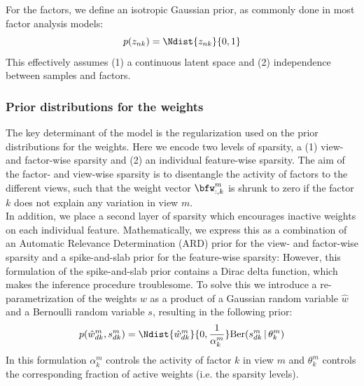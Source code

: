 For the factors, we define an isotropic Gaussian prior, as commonly done in most factor analysis models:
\begin{equation}
	p(z_{nk}) = \Ndist{z_{nk}}{0,1}
\end{equation}
This effectively  assumes (1) a continuous latent space and (2) independence between samples and factors. 

\subsubsection{Prior distributions for the weights}  \label{section:mofa_weights}

The key determinant of the model is the regularization used on the prior distributions for the weights. Here we encode two levels of sparsity, a (1) view- and factor-wise sparsity and (2) an individual feature-wise sparsity. The aim of the factor- and view-wise sparsity is to disentangle the activity of factors to the different views, such that the weight vector $\bfw_{:,k}^m$ is shrunk to zero if the factor $k$ does not explain any variation in view $m$. \\
In addition, we place a second layer of sparsity which encourages inactive weights on each individual feature. Mathematically, we express this as a combination of an Automatic Relevance Determination (ARD) prior \cite{Mackay1996} for the view- and factor-wise sparsity and a spike-and-slab prior \cite{Mitchell1988} for the feature-wise sparsity:
However, this formulation of the spike-and-slab prior contains a Dirac delta function, which makes the inference procedure troublesome. To solve this we introduce a re-parametrization of the weights $w$ as a product of a Gaussian random variable $\hat{w}$ and a Bernoulli random variable $s$, \cite{Titsias2011} resulting in the following prior:
\begin{equation}
	p(\hat{w}_{dk}^{m},s_{dk}^{m}) = \Ndist{\hat{w}_{dk}^{m}}{0, \frac{1}{\alpha_k^m}}  \text{Ber}(s_{dk}^m \,|\,\theta_k^m)
\end{equation}
In this formulation $\alpha_k^m$ controls the activity of factor $k$ in view $m$ and $\theta_k^m$ controls the corresponding fraction of active weights (i.e. the sparsity levels).\\

